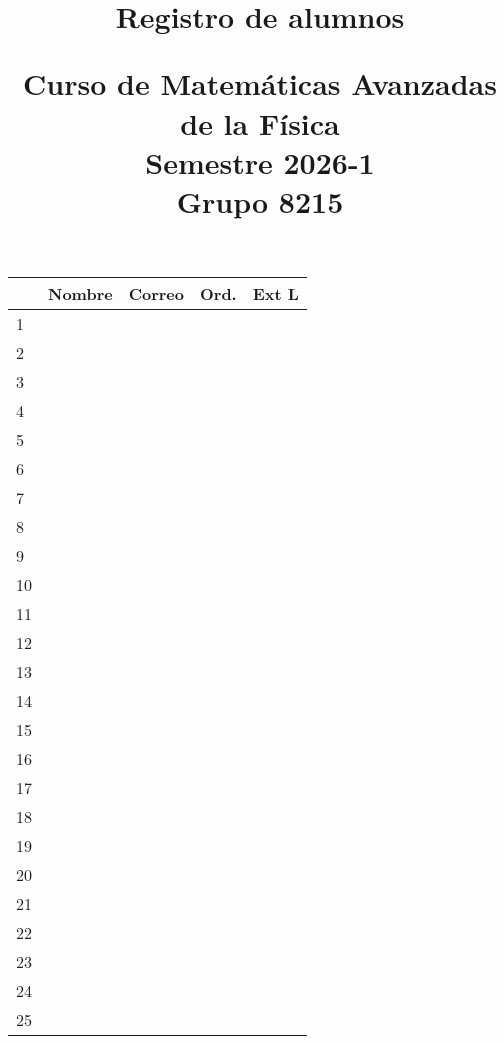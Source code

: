 \documentclass[11pt]{article}
\title{Registro de alumnos \\ \begin{large}Curso de Matemáticas Avanzadas de la Física \\ Semestre 2026-1   \\ Grupo 8215 \end{large}}
\author{}
\date{ }
\begin{document}
\maketitle
\fontsize{12}{12}\selectfont

\vspace*{-2cm}

\begin{longtable}{| l | >{\centering\arraybackslash}m{7cm}| >{\centering\arraybackslash}m{5cm} | c | c |}
\hline
 & Nombre & Correo & Ord. & Ext L \\
\endhead
\hline 1 & & & & \\
\hline 2 & & & &  \\
\hline 3 & & & &  \\
\hline 4 & & & &  \\
\hline 5 & & & &  \\
\hline 6 & & & &  \\
\hline 7 & & & &  \\
\hline 8 & & & &  \\
\hline 9 & & & &  \\
\hline 10 & & & &  \\
\hline 11 & & & &  \\
\hline 12 & & & &  \\
\hline 13 & & & &  \\
\hline 14 & & & &  \\
\hline 15 & & & &  \\
\hline 16 & & & &  \\
\hline 17 & & & &  \\
\hline 18 & & & &  \\
\hline 19 & & & &  \\
\hline 20 & & & &  \\
\hline 21 & & & &  \\
\hline 22 & & & &  \\
\hline 23 & & & &  \\
\hline 24 & & & &  \\
\hline 25 & & & &  \\
\hline
\end{longtable}
\end{document}
